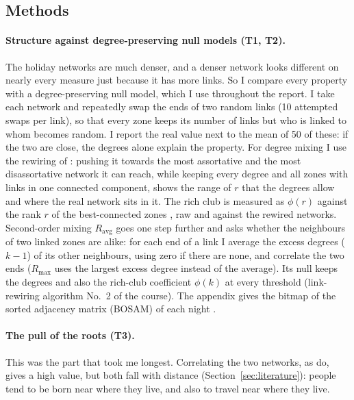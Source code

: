 \subsection{Methods}

\paragraph{Structure against degree-preserving null models (T1, T2).} The holiday networks are much denser, and a denser network looks different on nearly every measure just because it has more links. So I compare every property with a degree-preserving null model, which I use throughout the report. I take each network and repeatedly swap the ends of two random links (10 attempted swaps per link), so that every zone keeps its number of links but who is linked to whom becomes random. I report the real value next to the mean of 50 of these: if the two are close, the degrees alone explain the property. For degree mixing I use the rewiring of \citet{zhou2007structural}: pushing it towards the most assortative and the most disassortative network it can reach, while keeping every degree and all zones with links in one connected component, shows the range of $r$ that the degrees allow and where the real network sits in it. The rich club is measured as $\phi(r)$ against the rank $r$ of the best-connected zones \citep{zhou2004richclub}, raw and against the rewired networks. Second-order mixing $R_{\mathrm{avg}}$ \citep{zhou2017second} goes one step further and asks whether the neighbours of two linked zones are alike: for each end of a link I average the excess degrees ($k-1$) of its other neighbours, using zero if there are none, and correlate the two ends ($R_{\max}$ uses the largest excess degree instead of the average). Its null keeps the degrees and also the rich-club coefficient $\phi(k)$ at every threshold (link-rewiring algorithm No.~2 of the course). The appendix gives the bitmap of the sorted adjacency matrix (BOSAM) of each night \citep{guo2009fingerprint}.

\paragraph{The pull of the roots (T3).} This was the part that took me longest. Correlating the two networks, as \citet{li2016spring} do, gives a high value, but both fall with distance (Section~\ref{sec:literature}): people tend to be born near where they live, and also to travel near where they live.

